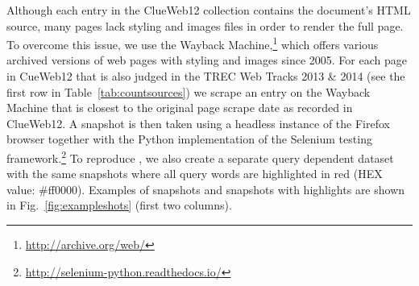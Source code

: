 
Although each entry in the ClueWeb12 collection contains the document's HTML source, many pages lack styling and images files in order to render the full page.
To overcome this issue, we use the Wayback Machine,\footnote{\url{http://archive.org/web/}} which offers various archived versions of web pages with styling and images since 2005.
For each page in CueWeb12 that is also judged in the TREC Web Tracks 2013 \& 2014 (see the first row in Table~\ref{tab:countsources})
we scrape an entry on the Wayback Machine that is closest to the original page scrape date as recorded in ClueWeb12.
A snapshot is then taken using a headless instance of the Firefox browser together with the Python implementation of the Selenium testing framework.\footnote{\url{http://selenium-python.readthedocs.io/}}
To reproduce \cite{fan2017learning}, we also create a separate query dependent dataset with the same snapshots where all query words are highlighted in red (HEX value: \#ff0000).
Examples of snapshots and snapshots with highlights are shown in Fig.~\ref{fig:exampleshots} (first two columns).

